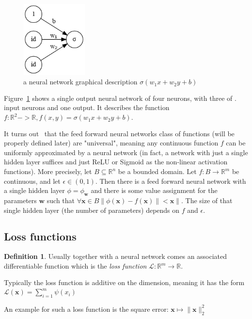 \documentclass[11pt, a4paper]{report}
\theoremstyle{plain}
\theoremstyle{definition}
\newtheorem{mydef}{Definition}[chapter]
\theoremstyle{remark}
\newcommand{\R}{\mathbb{R}}
\newcommand{\x}{\mathbf{x}}
\newcommand{\w}{\mathbf{w}}
\newcommand{\bv}[1]{\boldsymbol{#1}}
\newcommand{\lt}{<}
\begin{document}
\begin{figure}[b]
\centering
\includegraphics[width=0.3\textwidth]{./images/models/neuron.2.gv.png}
\caption{a neural network graphical description
$\sigma(w_1x + w_2y + b)$}
\label{fig:neuron1}
\end{figure}

Figure~\ref{fig:neuron1} shows a single output neural network of four neurons, with three of .
input neurons and one output. 
It describes the function $f : \R^2 -> \R, f(x,y) = \sigma(w_1x + w_2y + b)$. 

It turns out~\cite{nielsen2015neural} that the feed forward neural networks
class of functions (will be properly defined later)
are "universal", meaning any continuous function $f$ can be
uniformly approximated by a neural network (in fact, a network with just a
single hidden layer suffices and just ReLU or Sigmoid as the non-linear
activation functions).
More precisely, let $B \subseteq \R^n$ be a bounded domain. Let $f : B \to \R^m$
be continuous, and let $\epsilon \in (0,1)$. Then there is a feed forward neural
network with a single hidden layer $\phi = \phi_{\w}$ and there is some value assignment
for the parameters $\w$ such that 
$\forall \x \in B \|\phi(\x) - f(\x)\| \lt \x \|$. The size of that single
hidden layer (the number of parameters) depends on $f$ and $\epsilon$.


\subsection{Loss functions}

\begin{mydef}
\label{def:lossfunc}
Usually together with a neural network comes an associated differentiable
function which is the \textit{loss function} $\mathcal{L} : \R^m \to \R$.

Typically the loss function is additive on the dimension, meaning it has the
form $\mathcal{L}(\bv{x}) = \sum_{i=1}^m \psi(x_i)$

An example for such a loss function is the square error: $\x \mapsto \|\x\|_2^2$
\end{mydef}
\end{document}
